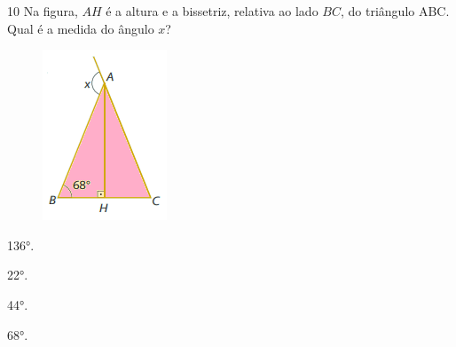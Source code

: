 

\pagebreak

\num{10} Na figura, $AH$ é a altura e a bissetriz, relativa ao lado $BC$, do
triângulo ABC. Qual é a medida do ângulo $x$?

\begin{figure}[H]
\centering\includegraphics[width=.5\textwidth]{./imgSAEB_8_MAT/media/image58.png}
\end{figure}


\begin{escolha}
\item 136°.
\item 22°.
\item 44°.
\item 68°.
\end{escolha}


